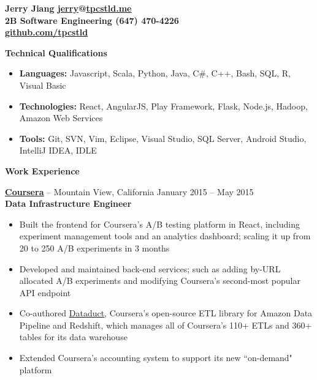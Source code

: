 \documentclass{letter}
\begin{document}
  \thispagestyle{empty}


{\bfseries
  {\Large Jerry Jiang} \hfill \href{mailto:jerry@tpcstld.me}{\uline{jerry}}@\href{//tpcstld.me}{\uline{tpcstld.me}} \\
  2B Software Engineering \hfill (647) 470-4226 \\
\null \hfill \href{https://github.com/tpcstld}{\uline{github.com/tpcstld}}} \\
\null \hrulefill

{\bfseries \Large Technical Qualifications}
\vspace{-3mm}
\begin{itemize}
    \item {\bfseries Languages:}
        Javascript, Scala, Python, Java, C\#, C++, Bash, SQL, R, Visual Basic
    \item {\bfseries Technologies:}
        React, AngularJS, Play Framework, Flask, Node.js, Hadoop, Amazon Web Services
    \item {\bfseries Tools:}
        Git, SVN, Vim, Eclipse, Visual Studio, SQL Server, Android Studio, IntelliJ IDEA, IDLE
\end{itemize}

{\bfseries \Large Work Experience}

\vspace{-1.5mm}
{\bfseries \href{https://www.coursera.org}{\uline{Coursera}}} -- Mountain View, California \hfill January 2015 -- May 2015 \\
{\bfseries Data Infrastructure Engineer}
\vspace{-3mm}
\begin{itemize}
    \item Built the frontend for Coursera's A/B testing platform in React, including
      experiment management tools and an analytics dashboard; scaling it up from 20 to
      250 A/B experiments in 3 months
    \item Developed and maintained back-end services; such as adding by-URL allocated
      A/B experiments and modifying Coursera's second-most popular API endpoint
    \item Co-authored \href{https://github.com/coursera/dataduct}{\uline{Dataduct}},
      Coursera's open-source ETL library for Amazon Data Pipeline and
      Redshift, which manages all of Coursera's 110+ ETLs and 360+ tables for its data warehouse
    \item Extended Coursera's accounting system to support its new ``on-demand" platform
\end{itemize}
\end{document}
